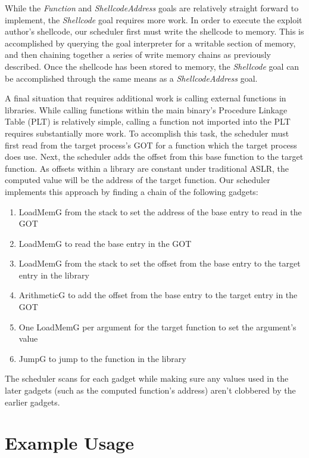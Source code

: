 \documentclass[journal]{IEEEtran}
\begin{document}
While the \emph{Function} and \emph{ShellcodeAddress} goals are relatively straight forward to implement, the \emph{Shellcode} goal requires more work. 
In order to execute the exploit author's shellcode, our scheduler first must write the shellcode to memory.
This is accomplished by querying the goal interpreter for a writable section of memory, and then chaining together a series of write memory chains as previously described.
Once the shellcode has been stored to memory, the \emph{Shellcode} goal can be accomplished through the same means as a \emph{ShellcodeAddress} goal.

A final situation that requires additional work is calling external functions in libraries.
While calling functions within the main binary's Procedure Linkage Table (PLT) is relatively simple, calling a function not imported into the PLT requires substantially more work.
To accomplish this task, the scheduler must first read from the target process's GOT for a function which the target process does use.
Next, the scheduler adds the offset from this base function to the target function.
As offsets within a library are constant under traditional ASLR, the computed value will be the address of the target function.
Our scheduler implements this approach by finding a chain of the following gadgets:
\begin{enumerate}
  \item LoadMemG from the stack to set the address of the base entry to read in the GOT
  \item LoadMemG to read the base entry in the GOT
  \item LoadMemG from the stack to set the offset from the base entry to the target entry in the library
  \item ArithmeticG to add the offset from the base entry to the target entry in the GOT
  \item One LoadMemG per argument for the target function to set the argument's value
  \item JumpG to jump to the function in the library
\end{enumerate}
The scheduler scans for each gadget while making sure any values used in the later gadgets (such as the computed function's address) aren't clobbered by the earlier gadgets.

\section{Example Usage}\label{examples}
\end{document}
